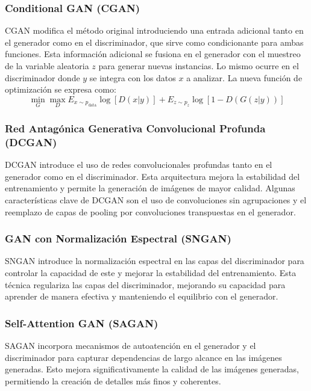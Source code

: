 \subsubsection{Conditional GAN (CGAN)}
CGAN modifica el método original introduciendo una entrada adicional tanto en el generador como en el discriminador, que sirve como condicionante para ambas funciones. Esta información adicional se fusiona en el generador con el muestreo de la variable aleatoria \( z \) para generar nuevas instancias. Lo mismo ocurre en el discriminador donde \( y \) se integra con los datos \( x \) a analizar. La nueva función de optimización se expresa como:
\begin{equation}
\min_G \max_D E_{x \sim p_{\text{data}}} \log[D(x|y)] + E_{z \sim p_z} \log[1-D(G(z|y))]
\end{equation}

\subsubsection{Red Antagónica Generativa Convolucional Profunda (DCGAN)}
DCGAN introduce el uso de redes convolucionales profundas tanto en el generador como en el discriminador. Esta arquitectura mejora la estabilidad del entrenamiento y permite la generación de imágenes de mayor calidad. Algunas características clave de DCGAN son el uso de convoluciones sin agrupaciones y el reemplazo de capas de pooling por convoluciones transpuestas en el generador.

\subsubsection{GAN con Normalización Espectral (SNGAN)}
SNGAN introduce la normalización espectral en las capas del discriminador para controlar la capacidad de este y mejorar la estabilidad del entrenamiento. Esta técnica regulariza las capas del discriminador, mejorando su capacidad para aprender de manera efectiva y manteniendo el equilibrio con el generador.

\subsubsection{Self-Attention GAN (SAGAN)}
SAGAN incorpora mecanismos de autoatención en el generador y el discriminador para capturar dependencias de largo alcance en las imágenes generadas. Esto mejora significativamente la calidad de las imágenes generadas, permitiendo la creación de detalles más finos y coherentes.


